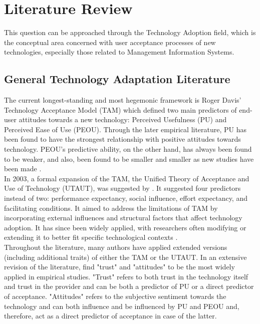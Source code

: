 \section{Literature Review}
This question can be approached through the Technology Adoption field, which is the conceptual area concerned with user acceptance processes of new technologies, especially those related to Management Information Systems.

\subsection{General Technology Adaptation Literature}
The current longest-standing and most hegemonic framework is Roger Davis' Technology Acceptance Model (TAM) which defined two main predictors of end-user attitudes towards a new technology: Perceived Usefulness (PU) and Perceived Ease of Use (PEOU). Through the later empirical literature, PU has been found to have the strongest relationship with positive attitudes towards technology. PEOU's predictive ability, on the other hand, has always been found to be weaker, and also, been found to be smaller and smaller as new studies have been made \parencite{davis_technology_1985, davis_perceived_1989, kelly_what_2023}.  \\

In 2003, a formal expansion of the TAM, the Unified Theory of Acceptance and Use of Technology (UTAUT), was suggested by \textcite{venkatesh_user_2003}. It suggested four predictors instead of two: performance expectancy, social influence, effort expectancy, and facilitating conditions. It aimed to address the limitations of TAM by incorporating external influences and structural factors that affect technology adoption. It has since been widely applied, with researchers often modifying or extending it to better fit specific technological contexts \parencite{venkatesh_user_2003, hasan_emon_insights_2023}.\\

Throughout the literature, many authors have applied extended versions (including additional traits) of either the TAM or the UTAUT. In an extensive revision of the literature, \textcite{kelly_what_2023} find "trust" and "attitudes" to be the most widely applied in empirical studies. "Trust" refers to both trust in the technology itself and trust in the provider and can be both a predictor of PU or a direct predictor of acceptance. "Attitudes" refers to the subjective sentiment towards the technology and can both influence and be influenced by PU and PEOU and, therefore, act as a direct predictor of acceptance in case of the latter. \\

